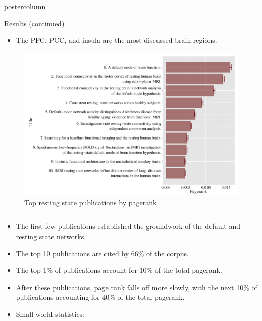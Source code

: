 \documentclass[final,hyperref={pdfpagelabels=false}]{beamer}
\begin{document}
\begin{frame}
\begin{columns}
\begin{column}{.5\textwidth}
\begin{beamercolorbox}[center,wd=\textwidth]{postercolumn}
\begin{minipage}[T]{.96\textwidth}
{\begin{block}{Results (continued)}
\begin{center}
\begin{itemize}
                \item The PFC, PCC, and insula are the most discussed brain regions.
                \end{itemize}
                  \begin{figure}
                      \begin{center}
                          \includegraphics[width=.99\linewidth]{citations.pdf}
                      \end{center}
                      \caption{\label{fig:citation_ranks}Top resting state publications by pagerank}
                   \end{figure}
              \begin{columns}
              \begin{column}{.40\linewidth}
                              \vspace{0pt}
                \begin{center}
                \begin{itemize}
                	        \item The first few publications established the groundwork of the default  and resting state networks.	                  
                	        \item The top 10 publications are cited by 66\% of the corpus.      		
                		\item The top 1\% of publications account for 10\% of the total pagerank. 
			\item After these publications, page rank falls off more slowly, with the next 10\% of publications accounting for 40\% of the total pagerank. 
			\item Small world statistics: 
			\begin{itemize}

\end{itemize}
\end{itemize}
\end{center}
\end{column}
\end{columns}
\end{center}
\end{block}}
\end{minipage}
\end{beamercolorbox}
\end{column}
\end{columns}
\end{frame}
\end{document}
